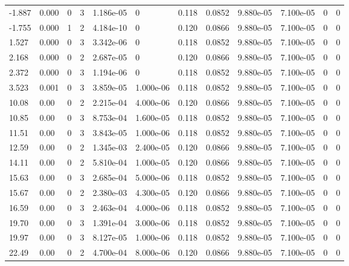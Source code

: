 \documentclass[preview]{standalone}
\begin{document}
{{\begin{tabular}{L{1.2cm}C{1.2cm} C{0.3cm}C{0.5cm} C{1.4cm}C{1.4cm} C{1.4cm}C{1.4cm} C{1.6cm}C{1.6cm} C{1.6cm}C{1.6cm}}
  -1.887  &  0.000  & 0     &  3 &  1.186e-05  & 0  &  0.118&   0.0852& 9.880e-05 & 7.100e-05   &  0 & 0  \\ 
  -1.755  &  0.000  & 1     &  2 &  4.184e-10  & 0  &  0.120&   0.0866& 9.880e-05 & 7.100e-05   &  0 & 0  \\ 
  1.527  &  0.000  & 0     &  3 &  3.342e-06  & 0  &  0.118&   0.0852& 9.880e-05 & 7.100e-05   &  0 & 0  \\ 
  2.168  &  0.000  & 0     &  2 &  2.687e-05  & 0  &  0.120&   0.0866& 9.880e-05 & 7.100e-05   &  0 & 0  \\ 
  2.372  &  0.000  & 0     &  3 &  1.194e-06  & 0  &  0.118&   0.0852& 9.880e-05 & 7.100e-05   &  0 & 0  \\ 
  3.523  &  0.001  & 0     &  3 &  3.859e-05  & 1.000e-06  &  0.118&   0.0852& 9.880e-05 & 7.100e-05   &  0 & 0  \\ 
  10.08  &  0.00  & 0     &  2 &  2.215e-04  & 4.000e-06  &  0.120&   0.0866& 9.880e-05 & 7.100e-05   &  0 & 0  \\ 
  10.85  &  0.00  & 0     &  3 &  8.753e-04  & 1.600e-05  &  0.118&   0.0852& 9.880e-05 & 7.100e-05   &  0 & 0  \\ 
  11.51  &  0.00  & 0     &  3 &  3.843e-05  & 1.000e-06  &  0.118&   0.0852& 9.880e-05 & 7.100e-05   &  0 & 0  \\ 
  12.59  &  0.00  & 0     &  2 &  1.345e-03  & 2.400e-05  &  0.120&   0.0866& 9.880e-05 & 7.100e-05   &  0 & 0  \\ 
  14.11  &  0.00  & 0     &  2 &  5.810e-04  & 1.000e-05  &  0.120&   0.0866& 9.880e-05 & 7.100e-05   &  0 & 0  \\ 
  15.63  &  0.00  & 0     &  3 &  2.685e-04  & 5.000e-06  &  0.118&   0.0852& 9.880e-05 & 7.100e-05   &  0 & 0  \\ 
  15.67  &  0.00  & 0     &  2 &  2.380e-03  & 4.300e-05  &  0.120&   0.0866& 9.880e-05 & 7.100e-05   &  0 & 0  \\ 
  16.59  &  0.00  & 0     &  3 &  2.463e-04  & 4.000e-06  &  0.118&   0.0852& 9.880e-05 & 7.100e-05   &  0 & 0  \\ 
  19.70  &  0.00  & 0     &  3 &  1.391e-04  & 3.000e-06  &  0.118&   0.0852& 9.880e-05 & 7.100e-05   &  0 & 0  \\ 
  19.97  &  0.00  & 0     &  3 &  8.127e-05  & 1.000e-06  &  0.118&   0.0852& 9.880e-05 & 7.100e-05   &  0 & 0  \\ 
  22.49  &  0.00  & 0     &  2 &  4.700e-04  & 8.000e-06  &  0.120&   0.0866& 9.880e-05 & 7.100e-05   &  0 & 0  \\ 

\end{tabular}}}
\end{document}
